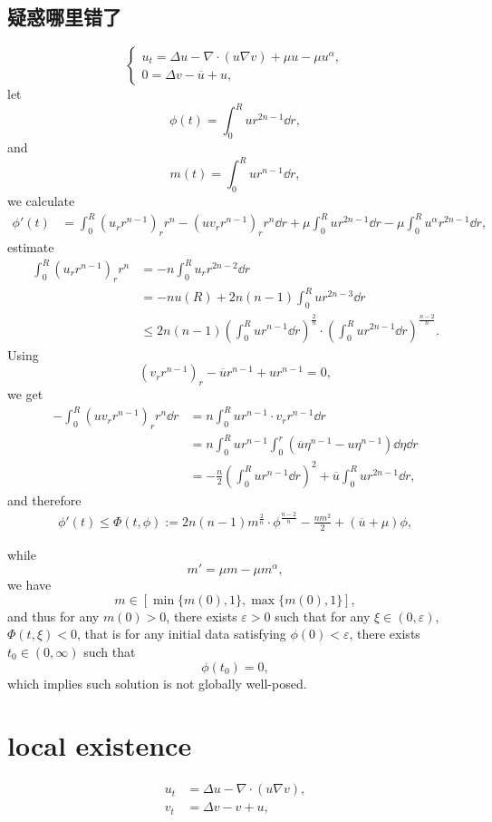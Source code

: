\subsection{疑惑哪里错了}
\begin{equation}
	\begin{cases}
		u_t = \Delta u - \nabla\cdot(u\nabla v) + \mu u - \mu u^\alpha,\\
		0 = \Delta v - \overline u + u,
	\end{cases}
\end{equation}
let 
\[
	\phi(t) = \int_0^R ur^{2n-1}\dd r,
\]
and
\[
	m(t) = \int_0^R ur^{n-1}\dd r,
\]
we calculate
\begin{align*}
	\phi'(t) &=
	\int_0^R(u_rr^{n-1})_rr^n - (uv_rr^{n-1})_rr^n\dd r 
		+ \mu\int_0^R u r^{2n-1}\dd r - \mu \int_0^Ru^\alpha r^{2n-1}\dd r,
\end{align*}
estimate
\begin{align*}
	\int_0^R(u_rr^{n-1})_rr^n 
		&= - n\int_0^Ru_rr^{2n-2}\dd r\\
		&= -nu(R) + 2n(n-1)\int_0^Rur^{2n-3}\dd r\\
		&\leq 2n(n-1)\left(\int_0^Rur^{n-1}\dd r\right)^{\frac{2}{n}}
			\cdot \left(\int_0^Rur^{2n-1}\dd r\right)^{\frac{n-2}{n}}.
\end{align*}
Using 
\[
	(v_rr^{n-1})_r -\overline{u}r^{n-1} + ur^{n-1} = 0,
\]
we get
\begin{align*}
	- \int_0^R (uv_rr^{n-1})_rr^n\dd r 
		&= n\int_0^Rur^{n-1}\cdot v_rr^{n-1}\dd r \\
		&= n\int_0^R ur^{n-1} \int_0^r(\overline{u}\eta^{n-1} - u\eta^{n-1})\dd\eta\dd r\\
		&= - \frac{n}2\left(\int_0^Rur^{n-1}\dd r\right)^2 + \overline{u}\int_0^R ur^{2n-1}\dd r, 
\end{align*}
and therefore
\begin{align*}
	\phi'(t) \leq \Phi(t, \phi) := 2n(n-1)m^{\frac2n}\cdot \phi^{\frac{n-2}{n}} - \frac{nm^2}2 + (\overline{u} + \mu)\phi,
\end{align*}

while
\[
	m' = \mu m - \mu m^\alpha,
\]
we have 
\[
	m\in\left[\min\{m(0),1\}, \max\{m(0),1\}\right],
\]
and thus for any $m(0)>0$, there exists $\varepsilon>0$ 
such that for any $\xi\in(0,\varepsilon)$,
$\Phi(t,\xi) < 0$,
that is for any initial data satisfying $\phi(0) < \varepsilon$, 
there exists $t_0\in(0,\infty)$ such that 
\[
	\phi(t_0) = 0,
\]
which implies such solution is not globally well-posed.

\section{local existence}
\begin{align*}
	u_t &= \Delta u - \nabla\cdot(u\nabla v),\\
	v_t &= \Delta v - v + u,
\end{align*}

